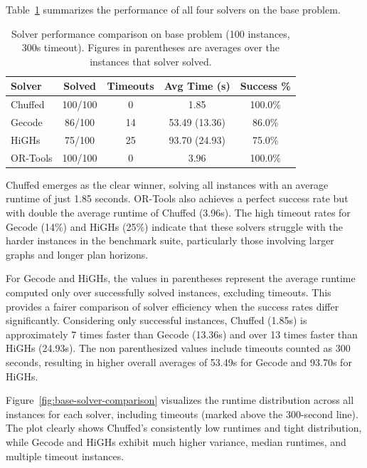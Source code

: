\documentclass[a4paper,12pt]{article}
\begin{document}
Table~\ref{tab:base-solver-stats} summarizes the performance of all four solvers on the base problem.

\begin{table}[H]
    \centering
    \caption{Solver performance comparison on base problem (100 instances, 300s timeout). Figures in parentheses are averages over the instances that solver solved.}
    \label{tab:base-solver-stats}
    \begin{tabular}{|l|c|c|c|c|}
        \hline
        \textbf{Solver} & \textbf{Solved} & \textbf{Timeouts} & \textbf{Avg Time (s)} & \textbf{Success \%} \\
        \hline
        Chuffed         & 100/100         & 0                 & 1.85                  & 100.0\%             \\
        Gecode          & 86/100          & 14                & 53.49 (13.36)         & 86.0\%              \\
        HiGHs           & 75/100          & 25                & 93.70 (24.93)         & 75.0\%              \\
        OR-Tools        & 100/100         & 0                 & 3.96                  & 100.0\%             \\
        \hline
    \end{tabular}
\end{table}

Chuffed emerges as the clear winner, solving all instances with an average runtime of just 1.85 seconds. OR-Tools also achieves a perfect success rate but with double the average runtime of Chuffed (3.96s). The high timeout rates for Gecode (14\%) and HiGHs (25\%) indicate that these solvers struggle with the harder instances in the benchmark suite, particularly those involving larger graphs and longer plan horizons.

For Gecode and HiGHs, the values in parentheses represent the average runtime computed only over successfully solved instances, excluding timeouts. This provides a fairer comparison of solver efficiency when the success rates differ significantly. Considering only successful instances, Chuffed (1.85s) is approximately 7 times faster than Gecode (13.36s) and over 13 times faster than HiGHs (24.93s). The non parenthesized values include timeouts counted as 300 seconds, resulting in higher overall averages of 53.49s for Gecode and 93.70s for HiGHs.

Figure~\ref{fig:base-solver-comparison} visualizes the runtime distribution across all instances for each solver, including timeouts (marked above the 300-second line). The plot clearly shows Chuffed's consistently low runtimes and tight distribution, while Gecode and HiGHs exhibit much higher variance, median runtimes, and multiple timeout instances.
\end{document}

